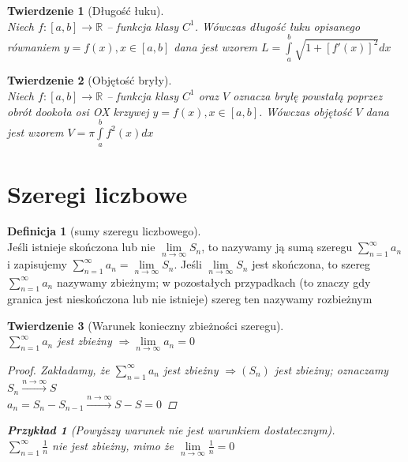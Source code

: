 \documentclass[12pt,a4paper]{article}
\newtheorem{tw}{Twierdzenie}
\newtheorem{przyklad}{Przykład}
\theoremstyle{definition}
\newtheorem{df}{Definicja}
\begin{document}
\begin{tw}[Długość łuku]~\\
Niech $f: [a,b] \to \mathbb{R}$ -- funkcja klasy $C^1$. Wówczas długość łuku opisanego równaniem $y=f(x), x\in [a,b]$ dana jest wzorem $L = \int\limits_a^b \sqrt{1 + \left[f'(x)\right]^2}dx$
\end{tw}

\begin{tw}[Objętość bryły]~\\
Niech $f: [a,b] \to \mathbb{R}$ -- funkcja klasy $C^1$ oraz $V$ oznacza bryłę powstałą poprzez obrót
 dookoła osi OX krzywej $y = f(x), x\in [a,b]$. Wówczas objętość $V$ dana jest wzorem $V = \pi\int\limits_a^b f^2(x)dx$
\end{tw}


\section{Szeregi liczbowe}

\begin{df}[sumy szeregu liczbowego]~\\
Jeśli istnieje skończona lub nie $\lim\limits_{n\to\infty}S_n$, to nazywamy ją sumą szeregu $\sum\limits_{n=1}^\infty a_n$ i zapisujemy $\sum\limits_{n=1}^\infty a_n=\lim\limits_{n\to\infty}S_n$.
Jeśli $\lim\limits_{n\to\infty}S_n$ jest skończona, to szereg $\sum\limits_{n=1}^\infty a_n$ nazywamy zbieżnym; w pozostałych przypadkach (to znaczy gdy granica jest nieskończona lub nie istnieje) szereg ten nazywamy rozbieżnym
\end{df}

\begin{tw}[Warunek konieczny zbieżności szeregu]~\\
$\sum\limits_{n=1}^\infty a_n$ jest zbieżny $\Rightarrow \lim\limits_{n\to\infty}a_n = 0$
\begin{proof}
Zakładamy, że $\sum\limits_{n=1}^\infty a_n$ jest zbieżny $\Rightarrow (S_n)$ jest zbieżny; oznaczamy 
$S_n \xrightarrow{n\to\infty} S$\\
$a_n = S_n - S_{n-1} \xrightarrow{n\to\infty} S - S = 0$ 
\end{proof}
\begin{przyklad}[Powyższy warunek nie jest warunkiem dostatecznym]~\\
$\sum\limits_{n=1}^\infty \frac{1}{n}$ nie jest zbieżny, mimo że $\lim\limits_{n\to\infty} \frac{1}{n} = 0$
\end{przyklad}
\end{tw}
\end{document}
